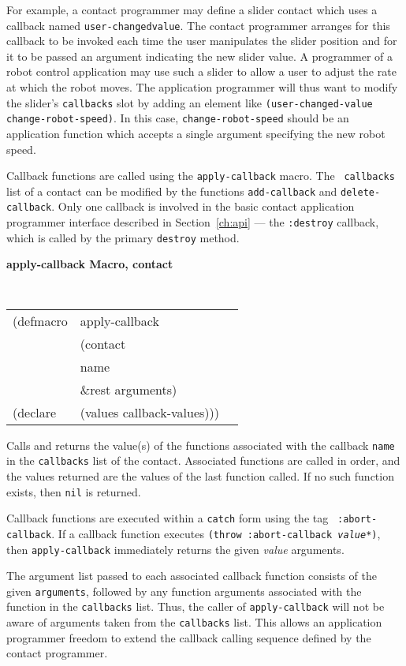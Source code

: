 For example, a contact programmer may define a slider contact which uses a
callback named {\tt user-changed\-value}.  The contact programmer arranges for
this callback to be invoked each time the user manipulates the slider position
and for it to be passed an argument indicating the new slider value.  A
programmer of a robot control application may use such a slider to
allow a user to adjust the rate at which the robot moves.  The application
programmer will thus want to modify the slider's {\tt callbacks} slot by adding
an element like {\tt (user-changed-value change-robot-speed)}. In this case,
{\tt change-robot-speed} should be an application function which accepts a
single argument specifying the new robot speed.

Callback functions are called using the {\tt apply-callback} macro.  The {\tt
callbacks} list of a contact can be modified by the functions {\tt add-callback}
and {\tt delete-callback}. Only one callback is involved in the basic
contact application programmer interface described in
Section~\ref{ch:api} --- the {\tt :destroy} callback, which is called by
the primary {\tt destroy} method.

{\samepage
{\large {\bf apply-callback \hfill Macro, contact}} 

\begin{flushright} \parbox[t]{6.125in}{
\tt
\begin{tabular}{lll}
\raggedright
(defmacro & apply-callback & \\ 
& (contact\\
&  name\\
& \&rest arguments)\\
(declare &(values callback-values)))
\end{tabular}
\rm

}\end{flushright}
}

\begin{flushright} 
\parbox[t]{6.125in}{
Calls and returns the value(s) of the functions associated with the callback
{\tt name} in the
{\tt callbacks} list of the contact. Associated functions are called in order,
and the values returned are the values of the last function called. If no such
function exists, then {\tt nil} is returned.} 

\parbox[t]{6.125in}{
Callback functions are executed within a {\tt catch} form using the tag {\tt
:abort-callback}.  If a callback function executes {\tt (throw :abort-callback
{\em value*})}, then {\tt apply-callback} immediately returns the given {\em
value} arguments.
}

\parbox[t]{6.125in}{ The argument list passed to each associated callback
function consists of the given {\tt arguments}, followed by any function
arguments associated with the function in the {\tt callbacks} list.  Thus, the
caller of {\tt apply-callback} will not be aware of arguments taken from the
{\tt callbacks} list.  This allows an application programmer freedom to extend
the callback calling sequence defined by the contact programmer.  }
\end{flushright}

